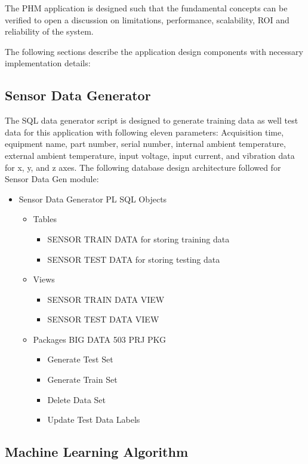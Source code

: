 \documentclass[sigconf]{acmart}
\begin{document}
The PHM application is designed such that the fundamental concepts can be verified to open a discussion on limitations, performance, scalability, ROI and reliability of the system.

The following sections describe the application design components with necessary implementation details:
\subsection{Sensor Data Generator}
The SQL data generator script is designed to generate training data as well test data for this application with following eleven parameters: Acquisition time, equipment name, part number, serial number, internal ambient temperature, external ambient temperature, input voltage, input current, and vibration data for x, y, and z axes. 
The following database design architecture followed for Sensor Data Gen module:
\begin{itemize}
  \item Sensor Data Generator PL SQL Objects
  \begin{itemize}
  \item Tables
\begin{itemize}
\item SENSOR TRAIN DATA for storing training data
\item SENSOR TEST DATA for storing testing data
\end{itemize}
\item Views
\begin{itemize}
\item SENSOR TRAIN DATA VIEW 
\item SENSOR TEST DATA VIEW
\end{itemize}
\item Packages BIG DATA 503 PRJ PKG
\begin{itemize}
\item Generate Test Set
\item Generate Train Set
\item Delete Data Set
\item Update Test Data Labels
\end{itemize}
\end{itemize}
\end{itemize}

\subsection{Machine Learning Algorithm}
\end{document}
